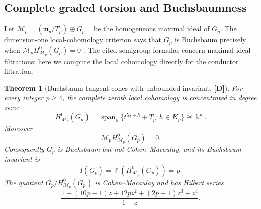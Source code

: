 \documentclass[11pt]{article}
\newtheorem{theorem}{Theorem}[section]
\theoremstyle{definition}
\theoremstyle{remark}
\newcommand{\kfield}{\Bbbk}
\begin{document}
\subsection{Complete graded torsion and Buchsbaumness}

Let $\mathcal M_p=(\mathfrak m_p/T_p)\oplus G_{p,+}$ be the homogeneous maximal ideal of
$G_p$. The dimension-one local-cohomology criterion says that $G_p$ is Buchsbaum precisely when
$\mathcal M_pH^0_{\mathcal M_p}(G_p)=0$ \cite{DAnnaMezzasalmaMicale2009,DAnnaMicaleSammartano2011}.
The cited semigroup formulas concern maximal-ideal filtrations; here we compute the local
cohomology directly for the conductor filtration.

\begin{theorem}[Buchsbaum tangent cones with unbounded invariant, {\bf[D]}]
\label{thm:buchsbaum}
For every integer $p\ge4$, the complete zeroth local cohomology is concentrated in degree zero:
\[
H^0_{\mathcal M_p}(G_p)
=\operatorname{span}_{\kfield}
 \{t^{5s+h}+T_p:h\in K_p\}\cong \kfield^p.
\]
Moreover
\[
\mathcal M_pH^0_{\mathcal M_p}(G_p)=0.
\]
Consequently $G_p$ is Buchsbaum but not Cohen--Macaulay, and its Buchsbaum invariant is
\[
I(G_p)=\ell(H^0_{\mathcal M_p}(G_p))=p.
\]
The quotient $G_p/H^0_{\mathcal M_p}(G_p)$ is Cohen--Macaulay and has Hilbert series
\[
\frac{1+(10p-1)z+12pz^2+(2p-1)z^3+z^4}{1-z}.
\]
\end{theorem}
\end{document}
